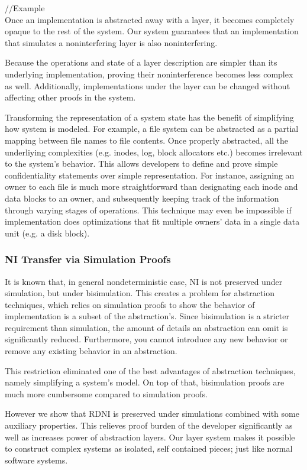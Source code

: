 //Example\\

Once an implementation is abstracted away with a layer, it becomes completely opaque to the rest of the system. Our system guarantees that an implementation that simulates a noninterfering layer is also noninterfering.

Because the operations and state of a layer description are simpler than its underlying implementation, proving their noninterference becomes less complex as well. Additionally, implementations under the layer can be changed without affecting other proofs in the system.

Transforming the representation of a system state has the benefit of simplifying how system is modeled. For example, a file system can be abstracted as a partial mapping between file names to file contents. Once properly abstracted, all the underliying complexities (e.g. inodes, log, block allocators etc.) becomes irrelevant to the system's behavior. This allows developers to define and prove simple confidentiality statements over simple representation. For instance, assigning an owner to each file is much more straightforward than designating each inode and data blocks to an owner, and subsequently keeping track of the information through varying stages of operations. This technique may even be impossible if implementation does optimizations that fit multiple owners' data in a single data unit (e.g. a disk block).

\subsubsection*{NI Transfer via Simulation Proofs}
It is known that, in general nondeterministic case, NI is not preserved under simulation, but under bisimulation. This creates a problem for abstraction techniques, which relies on simulation proofs to show the behavior of implementation is a subset of the abstraction's. Since bisimulation is a stricter requirement than simulation, the amount of details an abstraction can omit is significantly reduced. Furthermore, you cannot introduce any new behavior or remove any existing behavior in an abstraction.

This restriction eliminated one of the best advantages of abstraction techniques, namely simplifying a system's model.
On top of that, bisimulation proofs are much more cumbersome compared to simulation proofs. 

However we show that RDNI is preserved under simulations combined with some auxiliary properties. This relieves proof burden of the developer significantly as well as increases power of abstraction layers. Our layer system makes it possible to construct complex systems as isolated, self contained pieces; just like normal software systems.

